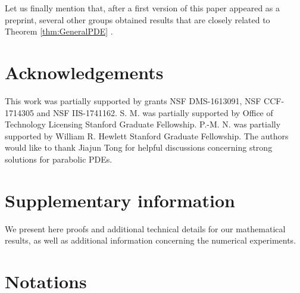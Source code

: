 \documentclass[11pt]{article}
\begin{document}
Let us finally mention that, after a first version of this paper appeared as a preprint, several other groups obtained results that are closely related to 
Theorem \ref{thm:GeneralPDE} \cite{rotskoff2018neural,sirignano2018mean,chizat2018global}.
%
%
\section*{Acknowledgements}
This work was partially supported by grants NSF DMS-1613091, NSF CCF-1714305 and NSF IIS-1741162. S. M. was partially supported by Office of Technology Licensing Stanford Graduate Fellowship. P.-M. N. was partially supported by William R. Hewlett Stanford Graduate Fellowship. The authors would like to thank Jiajun Tong for helpful discussions concerning strong solutions for parabolic PDEs. 






\newpage

\section*{\hfil Supplementary information \hfil }

\vskip1cm

We present here proofs and additional technical details
for our mathematical results, as well as additional information concerning the numerical experiments. 



\section{Notations}
\label{sec:Notation}
\end{document}
